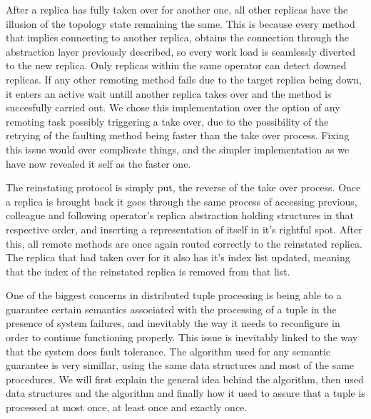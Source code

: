 \documentclass[times, 10pt,twocolumn]{article}
\begin{document}
After a replica has fully taken over for another one, all other replicas have the illusion of the topology state remaining the same. This is because every method that implies connecting to another replica, obtains the connection through the abstraction layer previously described, so every work load is seamlessly diverted to the new replica.
Only replicas within the same operator can detect downed replicas. If any other remoting method fails due to the target replica being down, it enters an active wait untill another replica takes over and the method is succesfully carried out. We chose this implementation over the option of any remoting task possibly triggering a take over, due to the possibility of the retrying of the faulting method being faster than the take over process. Fixing this issue would over complicate things, and the simpler implementation as we have now revealed it self as the faster one.

The reinstating protocol is simply put, the reverse of the take over process. Once a replica is brought back it goes through the same process of accessing previous, colleague and following operator's replica abstraction holding structures in that respective order, and inserting a representation of itself in it's rightful spot.
After this, all remote methods are once again routed correctly to the reinstated replica.
The replica that had taken over for it also has it's index list updated, meaning that the index of the reinstated replica is removed from that list.

One of the biggest concerns in distributed tuple processing is being
able to a guarantee certain semantics associated with the processing of
a tuple in the presence of system failures, and inevitably the way it
needs to reconfigure in order to continue functioning properly. This issue
is inevitably linked to the way that the system does fault tolerance. The
algorithm used for any semantic guarantee is very simillar, using the same
data structures and most of the same procedures. We will first explain the
general idea behind the algorithm, then used data structures and the
algorithm and finally how it used to assure that a tuple is processed at
most once, at least once and exactly once.

\end{document}
